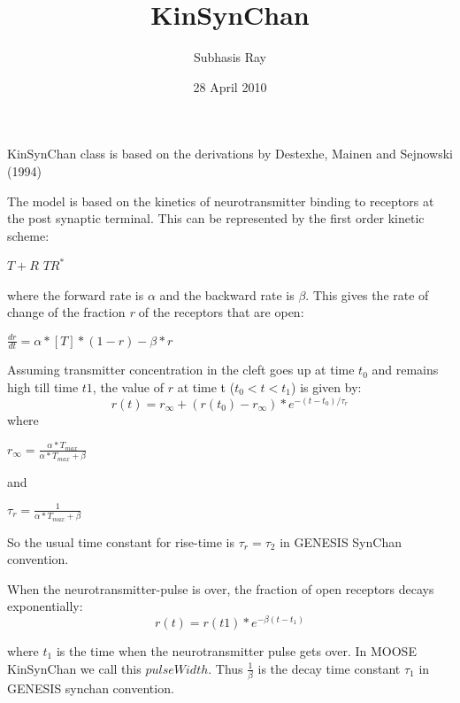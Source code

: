 \documentclass[11pt]{article}
\title{KinSynChan}
\author{Subhasis Ray}
\date{28 April 2010}
\begin{document}
\maketitle

\setcounter{tocdepth}{3}
\tableofcontents
\vspace*{1cm}

KinSynChan class is based on the derivations by Destexhe, Mainen and
Sejnowski (1994)\cite{destexhe_efficient_1994}

The model is based on the kinetics of neurotransmitter binding to
receptors at the post synaptic terminal. This can be represented by
the first order kinetic scheme:

\begin{center}
$T + R$
\xrightleftharpoons[{\beta}]{\alpha} 
$TR^{*}$
\end{center}

where the forward rate is $\alpha$ and the backward rate is $\beta$.
This gives the rate of change of the fraction \textit{r} of the
receptors that are open:

$\frac{dr}{dt} = \alpha * [T] * (1 - r ) - \beta * r$

Assuming transmitter concentration in the cleft goes up at time
$t_{0}$ and remains high till time $t1$, the value of $\textit{r}$ at
time t ($t_{0} < t < t_{1}$) is given by:
\begin{equation}
r(t) = r_{\infty} + (r(t_{0}) - r_{\infty}) * e^{-(t-t_{0})/\tau_{r}}
\end{equation}
where 
\begin{center}
  $r_{\infty} = \frac{\alpha * T_{max}}{\alpha * T_{max} + \beta}$
\end{center}

and 
\begin{center}
$\tau_{r} = \frac{1}{\alpha * T_{max} + \beta}$
\end{center}
So the usual time constant for rise-time is $\tau_{r} = \tau_{2}$ in
GENESIS SynChan convention.

When the neurotransmitter-pulse is over, the fraction of open
receptors decays exponentially:
\begin{equation}
  r(t) = r(t1) * e^{-\beta (t - t_{1})}
\end{equation}

where $t_{1}$ is the time when the neurotransmitter pulse gets over.
In MOOSE KinSynChan we call this $pulseWidth$.
Thus $\frac{1}{\beta}$ is the decay time constant $\tau_{1}$ in
GENESIS synchan convention.
\end{document}
